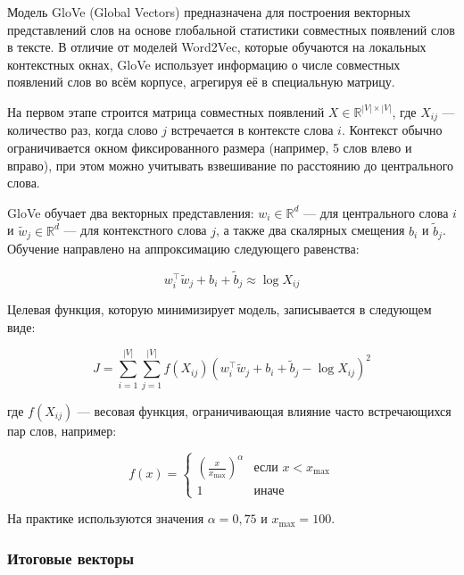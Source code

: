 \documentclass[coursework]{SCWorks}
\begin{document}
Модель GloVe (Global Vectors) предназначена для построения векторных представлений слов на основе глобальной статистики совместных появлений слов в тексте. В отличие от моделей Word2Vec, которые обучаются на локальных контекстных окнах, GloVe использует информацию о числе совместных появлений слов во всём корпусе, агрегируя её в специальную матрицу.

На первом этапе строится матрица совместных появлений $X \in \mathbb{R}^{|V| \times |V|}$, где $X_{ij}$ — количество раз, когда слово $j$ встречается в контексте слова $i$. Контекст обычно ограничивается окном фиксированного размера (например, 5 слов влево и вправо), при этом можно учитывать взвешивание по расстоянию до центрального слова.

GloVe обучает два векторных представления: $w_i \in \mathbb{R}^d$ — для центрального слова $i$ и $\tilde{w}_j \in \mathbb{R}^d$ — для контекстного слова $j$, а также два скалярных смещения $b_i$ и $\tilde{b}_j$. Обучение направлено на аппроксимацию следующего равенства:

\[
w_i^\top \tilde{w}_j + b_i + \tilde{b}_j \approx \log X_{ij}
\]

Целевая функция, которую минимизирует модель, записывается в следующем виде:

\[
J = \sum_{i=1}^{|V|} \sum_{j=1}^{|V|} f(X_{ij}) \left(w_i^\top \tilde{w}_j + b_i + \tilde{b}_j - \log X_{ij} \right)^2
\]

где $f(X_{ij})$ — весовая функция, ограничивающая влияние часто встречающихся пар слов, например:

\[
f(x) = 
\begin{cases}
\left(\frac{x}{x_{\text{max}}}\right)^\alpha & \text{если } x < x_{\text{max}} \\
1 & \text{иначе}
\end{cases}
\]

На практике используются значения $\alpha = 0{,}75$ и $x_{\text{max}} = 100$.


\subsubsection*{Итоговые векторы}
\end{document}

